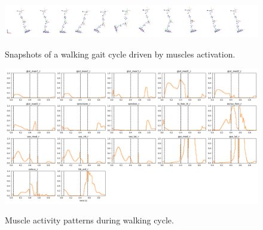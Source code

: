\begin{figure}[t!]
\centering
\includegraphics[width=\textwidth]{figures/multiphase_walking_cycle.png}\\
\caption{Snapshots of a walking gait cycle driven by muscles activation.}
\label{fig:snapshots_multiphase_walking_cycle}
\end{figure}

\begin{figure}[t!]
\centering
\includegraphics[width=\textwidth]{figures/muscles_control_gait_example.png}\\
\caption{Muscle activity patterns during walking cycle.}
\label{fig:muscles_activation_gait}
\end{figure}
